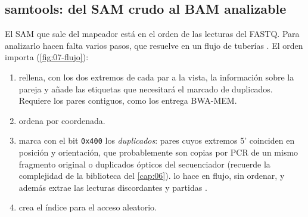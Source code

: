 \subsection{samtools: del SAM crudo al BAM analizable}

El SAM que sale del mapeador está en el orden de las lecturas del FASTQ. Para analizarlo hacen falta varios pasos, que  resuelve en un flujo de tuberías \parencite{c07-li2009sam,c07-danecek2021}. El orden importa (\cref{fig:07-flujo}):
\begin{enumerate}
  \item {} rellena, con los dos extremos de cada par a la vista, la información sobre la pareja y añade las etiquetas que necesitará el marcado de duplicados. Requiere los pares contiguos, como los entrega BWA-MEM.
  \item {} ordena por coordenada.
  \item {} marca con el bit \texttt{0x400} los \emph{duplicados}: pares cuyos extremos 5' coinciden en posición y orientación, que probablemente son copias por PCR de un mismo fragmento original o duplicados ópticos del secuenciador (recuerde la complejidad de la biblioteca del \cref{cap:06}).  lo hace en flujo, sin ordenar, y además extrae las lecturas discordantes y partidas \parencite{c07-faust2014}.
  \item {} crea el índice para el acceso aleatorio.
\end{enumerate}

